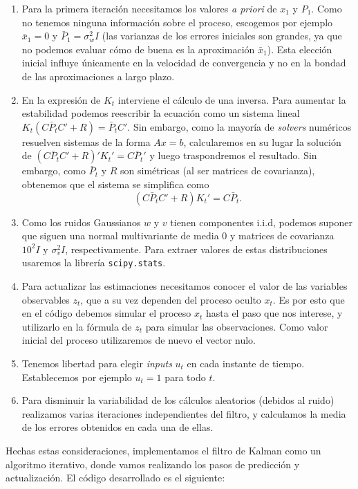 \documentclass[11pt,a4paper]{article}
\begin{document}
\begin{enumerate}
  \item Para la primera iteración necesitamos los valores \textit{a priori} de $x_1$ y $P_1$. Como no tenemos ninguna información sobre el proceso, escogemos por ejemplo $\bar x_1=0$ y $\bar P_1=\sigma_w^2I$ (las varianzas de los errores iniciales son grandes, ya que no podemos evaluar cómo de buena es la aproximación $\bar x_1$). Esta elección inicial influye únicamente en la velocidad de convergencia y no en la bondad de las aproximaciones a largo plazo.
  \item En la expresión de $K_t$ interviene el cálculo de una inversa. Para aumentar la estabilidad podemos reescribir la ecuación como un sistema lineal $K_t(C\bar P_tC' + R)=\bar P_tC'$. Sin embargo, como la mayoría de \textit{solvers} numéricos resuelven sistemas de la forma $Ax=b$, calcularemos en su lugar la solución de $(C\bar P_tC' + R)'K_t' = C\bar P_t'$ y luego traspondremos el resultado. Sin embargo, como $\bar P_t$ y $R$ son simétricas (al ser matrices de covarianza), obtenemos que el sistema se simplifica como
  \[
  (C\bar P_tC' + R)K_t' = C\bar P_t.
  \]
  \item Como los ruidos Gaussianos $w$ y $v$ tienen componentes i.i.d, podemos suponer que siguen una normal multivariante de media $0$ y matrices de covarianza $10^2I$ y $\sigma_v^2I$, respectivamente. Para extraer valores de estas distribuciones usaremos la librería \verb|scipy.stats|.
  \item Para actualizar las estimaciones necesitamos conocer el valor de las variables observables $z_t$, que a su vez dependen del proceso oculto $x_t$. Es por esto que en el código debemos simular el proceso $x_t$ hasta el paso que nos interese, y utilizarlo en la fórmula de $z_t$ para simular las observaciones. Como valor inicial del proceso utilizaremos de nuevo el vector nulo.
  \item Tenemos libertad para elegir \textit{inputs} $u_t$ en cada instante de tiempo. Establecemos por ejemplo $u_t=1$ para todo $t$.
  \item Para disminuir la variabilidad de los cálculos aleatorios (debidos al ruido) realizamos varias iteraciones independientes del filtro, y calculamos la media de los errores obtenidos en cada una de ellas.
\end{enumerate}

Hechas estas consideraciones, implementamos el filtro de Kalman como un algoritmo iterativo, donde vamos realizando los pasos de predicción y actualización. El código desarrollado es el siguiente:
\end{document}
